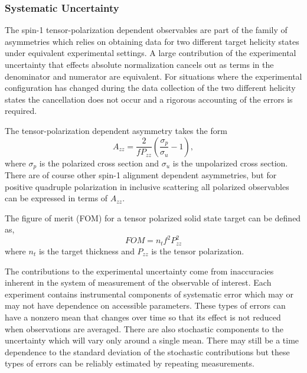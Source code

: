 \subsubsection{Systematic Uncertainty}


The spin-1 tensor-polarization dependent observables are part of the family of asymmetries which relies on obtaining data for two different target helicity states under equivalent experimental settings.  A large contribution of the experimental uncertainty that effects absolute normalization cancels out as terms in the denominator and numerator are equivalent.  For situations where the experimental configuration has changed during the data collection of the two different helicity states the cancellation does not occur and a rigorous accounting of the errors is required.

The tensor-polarization dependent asymmetry takes the form
\begin{equation}
A_{zz}=\frac{2}{fP_{zz}}\left(\frac{\sigma_p}{\sigma_u}-1\right),
\label{asy}
\end{equation}
where $\sigma_p$ is the polarized cross section and $\sigma_u$ is the unpolarized cross section. There are of course other spin-1 alignment dependent asymmetries, but for positive quadruple polarization in inclusive scattering all polarized observables can be expressed in terms of $A_{zz}$.

The figure of merit (FOM) for a tensor polarized solid state target can be defined as,
\begin{equation}
FOM=n_tf^2P_{zz}^2
\end{equation}
where $n_t$ is the target thickness and $P_{zz}$ is the tensor polarization.




The contributions to the experimental uncertainty come from inaccuracies inherent in the system of measurement of the
observable of interest.  Each experiment contains instrumental components of systematic error which may or may not have
dependence on accessible parameters.  These types of errors can have a nonzero mean that changes over time so that its
effect is not reduced when observations are averaged.  There are also stochastic components to the uncertainty which will vary
only around a single mean.  There may still be a time dependence to the standard deviation of the stochastic contributions
but these types of errors can be reliably estimated by repeating measurements.

